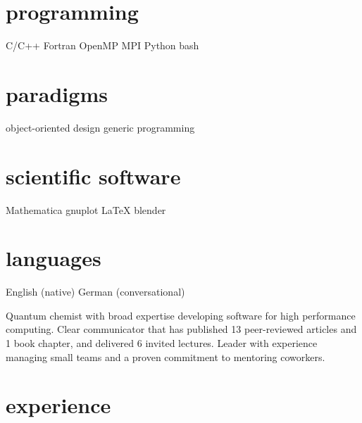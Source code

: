 \documentclass[resume]{parker-cv}
\renewcommand{\LARGE}{\fontsize{16}{18}\selectfont}
\newcommand{\askip}{\vspace{0.5em}}
\begin{document}

\begin{aside}
\section{programming}
C/C++ \askip
Fortran \askip
OpenMP \askip
MPI \askip
Python \askip
bash \askip
\section{paradigms}
object-oriented design
generic programming
\section{scientific software}
Mathematica \askip
gnuplot \askip
LaTeX \askip
blender \askip
\section{languages}
English (native) \askip
German (conversational) \askip
\end{aside}
\makebox[\textwidth]{{\LARGE\headingfont\color{gray} summary}}\vspace{0.25em}
Quantum chemist with broad expertise developing software for high performance
computing.
Clear communicator that has published 13 peer-reviewed articles and 1 book chapter,
and delivered 6 invited lectures.
Leader with experience managing small teams and a proven commitment
to mentoring coworkers.

\section{experience}\vspace{-0.5em}
\end{document}
